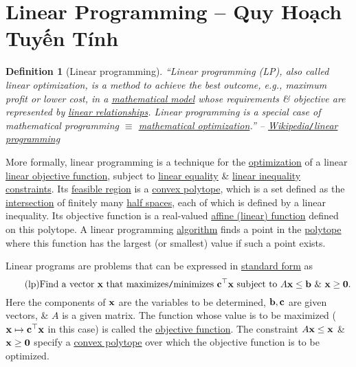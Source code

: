\documentclass{article}
\newtheorem{definition}{Definition}
\begin{document}
\section{Linear Programming -- Quy Hoạch Tuyến Tính}
\begin{definition}[Linear programming]
	``\emph{Linear programming (LP)}, also called \emph{linear optimization}, is a method to achieve the best outcome, e.g., maximum profit or lower cost, in a \href{https://en.wikipedia.org/wiki/Mathematical_model}{mathematical model} whose requirements \& objective are represented by \href{https://en.wikipedia.org/wiki/Linear_function#As_a_polynomial_function}{linear relationships}. Linear programming is a special case of mathematical programming $\equiv$ \href{https://en.wikipedia.org/wiki/Mathematical_optimization}{mathematical optimization}.'' -- \href{https://en.wikipedia.org/wiki/Linear_programming}{Wikipedia{\tt/}linear programming}
\end{definition}
More formally, linear programming is a technique for the \href{https://en.wikipedia.org/wiki/Mathematical_optimization}{optimization} of a linear \href{https://en.wikipedia.org/wiki/Objective_function}{linear objective function}, subject to \href{https://en.wikipedia.org/wiki/Linear_equality}{linear equality} \& \href{https://en.wikipedia.org/wiki/Linear_inequality}{linear inequality} \href{https://en.wikipedia.org/wiki/Constraint_(mathematics)}{constraints}. Its \href{https://en.wikipedia.org/wiki/Feasible_region}{feasible region} is a \href{https://en.wikipedia.org/wiki/Convex_polytope}{convex polytope}, which is a set defined as the \href{https://en.wikipedia.org/wiki/Intersection_(mathematics)}{intersection} of finitely many \href{https://en.wikipedia.org/wiki/Half-space_(geometry)}{half spaces}, each of which is defined by a linear inequality. Its objective function is a real-valued \href{https://en.wikipedia.org/wiki/Affine_function}{affine (linear) function} defined on this polytope. A linear programming \href{https://en.wikipedia.org/wiki/Algorithm}{algorithm} finds a point in the \href{https://en.wikipedia.org/wiki/Polytope}{polytope} where this function has the largest (or smallest) value if such a point exists.

Linear programs are problems that can be expressed in \href{https://en.wikipedia.org/wiki/Canonical_form}{standard form} as
\begin{equation}
	\label{linear program}
	\tag{lp}
	\mbox{Find a vector }{\bf x}\mbox{ that maximizes{\tt/}minimizes }{\bf c}^\top{\bf x}\mbox{ subject to } A{\bf x}\le{\bf b}\mbox{ \& }{\bf x}\ge{\bf 0}.
\end{equation}
Here the components of ${\bf x}$ are the variables to be determined, ${\bf b},{\bf c}$ are given vectors, \& $A$ is a given matrix. The function whose value is to be maximized (${\bf x}\mapsto{\bf c}^\top{\bf x}$ in this case) is called the \href{https://en.wikipedia.org/wiki/Objective_function}{objective function}. The constraint $A{\bf x}\le{\bf x}$ \& ${\bf x}\ge{\bf 0}$ specify a \href{https://en.wikipedia.org/wiki/Convex_polytope}{convex polytope} over which the objective function is to be optimized.
\end{document}
